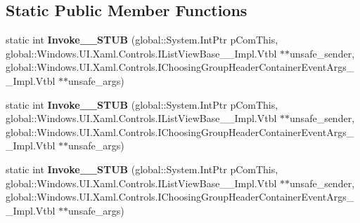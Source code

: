 \subsection*{Static Public Member Functions}
\begin{DoxyCompactItemize}
\item 
\mbox{\label{struct_windows_1_1_foundation_1_1_typed_event_handler___a___windows___u_i___xaml___controls___li89c076cde303fbaf0fcbca1d0fe1cbb9_ab78ad9b1b78ced46a0ef1ecc9f3a7a21}} 
static int {\bfseries Invoke\+\_\+\+\_\+\+S\+T\+UB} (global\+::\+System.\+Int\+Ptr p\+Com\+This, global\+::\+Windows.\+U\+I.\+Xaml.\+Controls.\+I\+List\+View\+Base\+\_\+\+\_\+\+Impl.\+Vtbl $\ast$$\ast$unsafe\+\_\+sender, global\+::\+Windows.\+U\+I.\+Xaml.\+Controls.\+I\+Choosing\+Group\+Header\+Container\+Event\+Args\+\_\+\+\_\+\+Impl.\+Vtbl $\ast$$\ast$unsafe\+\_\+args)
\item 
\mbox{\label{struct_windows_1_1_foundation_1_1_typed_event_handler___a___windows___u_i___xaml___controls___li89c076cde303fbaf0fcbca1d0fe1cbb9_ab78ad9b1b78ced46a0ef1ecc9f3a7a21}} 
static int {\bfseries Invoke\+\_\+\+\_\+\+S\+T\+UB} (global\+::\+System.\+Int\+Ptr p\+Com\+This, global\+::\+Windows.\+U\+I.\+Xaml.\+Controls.\+I\+List\+View\+Base\+\_\+\+\_\+\+Impl.\+Vtbl $\ast$$\ast$unsafe\+\_\+sender, global\+::\+Windows.\+U\+I.\+Xaml.\+Controls.\+I\+Choosing\+Group\+Header\+Container\+Event\+Args\+\_\+\+\_\+\+Impl.\+Vtbl $\ast$$\ast$unsafe\+\_\+args)
\item 
\mbox{\label{struct_windows_1_1_foundation_1_1_typed_event_handler___a___windows___u_i___xaml___controls___li89c076cde303fbaf0fcbca1d0fe1cbb9_ab78ad9b1b78ced46a0ef1ecc9f3a7a21}} 
static int {\bfseries Invoke\+\_\+\+\_\+\+S\+T\+UB} (global\+::\+System.\+Int\+Ptr p\+Com\+This, global\+::\+Windows.\+U\+I.\+Xaml.\+Controls.\+I\+List\+View\+Base\+\_\+\+\_\+\+Impl.\+Vtbl $\ast$$\ast$unsafe\+\_\+sender, global\+::\+Windows.\+U\+I.\+Xaml.\+Controls.\+I\+Choosing\+Group\+Header\+Container\+Event\+Args\+\_\+\+\_\+\+Impl.\+Vtbl $\ast$$\ast$unsafe\+\_\+args)

\end{DoxyCompactItemize}
